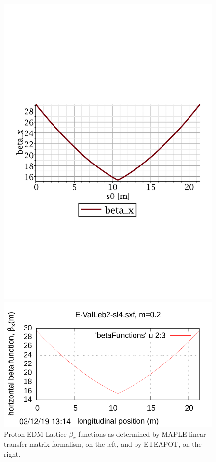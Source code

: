 \documentclass[12]{article}
\begin{document}
\begin{figure}[hbt]
\begin{minipage}{0.5\linewidth}
\centering
\includegraphics[scale=0.4]{pdf/MAPLE-betax_1cell.pdf}
\end{minipage}
\begin{minipage}{0.5\linewidth}
\centering
\includegraphics[scale=0.7]{pdf/BM-IV_Figure1r.pdf}
\end{minipage}
\caption{\label{WollnikVsETEAPOT-x}Proton EDM Lattice $\beta_x$ functions as determined by
MAPLE linear transfer matrix formalism, on the left, and by ETEAPOT, on the right.}
\end{figure}
\end{document}
